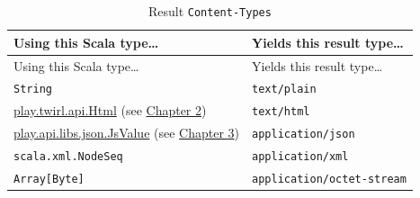 \documentclass[oneside,11pt,a4paper,]{book}
\begin{document}
\begin{longtable}[c]{@{}ll@{}}
\caption{Result \texttt{Content-Types}}\tabularnewline
\toprule
\begin{minipage}[b]{0.67\columnwidth}\raggedright\strut
Using this Scala type\ldots{}
\strut\end{minipage} &
\begin{minipage}[b]{0.27\columnwidth}\raggedright\strut
Yields this result type\ldots{}
\strut\end{minipage}\tabularnewline
\midrule
\endfirsthead
\toprule
\begin{minipage}[b]{0.67\columnwidth}\raggedright\strut
Using this Scala type\ldots{}
\strut\end{minipage} &
\begin{minipage}[b]{0.27\columnwidth}\raggedright\strut
Yields this result type\ldots{}
\strut\end{minipage}\tabularnewline
\midrule
\endhead
\begin{minipage}[t]{0.67\columnwidth}\raggedright\strut
\texttt{String}
\strut\end{minipage} &
\begin{minipage}[t]{0.27\columnwidth}\raggedright\strut
\texttt{text/plain}
\strut\end{minipage}\tabularnewline
\begin{minipage}[t]{0.67\columnwidth}\raggedright\strut
\href{https://github.com/playframework/twirl/blob/master/api/src/main/scala/play/twirl/api/Formats.scala}{play.twirl.api.Html}
(see \hyperref[chapter-html]{Chapter 2})
\strut\end{minipage} &
\begin{minipage}[t]{0.27\columnwidth}\raggedright\strut
\texttt{text/html}
\strut\end{minipage}\tabularnewline
\begin{minipage}[t]{0.67\columnwidth}\raggedright\strut
\href{https://www.playframework.com/documentation/2.3.x/api/scala/index.html\#play.api.libs.json.JsValue}{play.api.libs.json.JsValue}
(see \hyperref[chapter-json]{Chapter 3})
\strut\end{minipage} &
\begin{minipage}[t]{0.27\columnwidth}\raggedright\strut
\texttt{application/json}
\strut\end{minipage}\tabularnewline
\begin{minipage}[t]{0.67\columnwidth}\raggedright\strut
\texttt{scala.xml.NodeSeq}
\strut\end{minipage} &
\begin{minipage}[t]{0.27\columnwidth}\raggedright\strut
\texttt{application/xml}
\strut\end{minipage}\tabularnewline
\begin{minipage}[t]{0.67\columnwidth}\raggedright\strut
\texttt{Array{[}Byte{]}}
\strut\end{minipage} &
\begin{minipage}[t]{0.27\columnwidth}\raggedright\strut
\texttt{application/octet-stream}
\strut\end{minipage}\tabularnewline
\bottomrule
\end{longtable}
\end{document}
